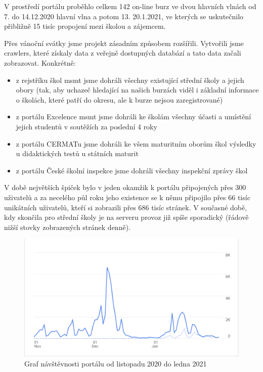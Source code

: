V prostředí portálu proběhlo celkem 142 on-line burz ve dvou hlavních vlnách od 7. do 14.12.2020 \textemdash{} hlavní vlna a potom 13. \textemdash{} 20.1.2021,
ve kterých se uskutečnilo přibližně 15 tisíc propojení mezi školou a zájemcem. 

Přes vánoční svátky jsme projekt zásadním způsobem rozšířili.
Vytvořili jsme \glspl{crawler}, které získaly data z veřejně dostupných databází a tato data začali zobrazovat. Konkrétně: 

\begin{itemize}
  \item z rejstříku škol \acrshort{msmt} jsme dohráli všechny existující střední školy a jejich obory (tak, aby uchazeč hledající na našich burzách viděl i základní informace o školách, které patří do okresu, ale k burze nejsou zaregistrované)
  \item z portálu Excelence \acrshort{msmt} jsme dohráli ke školám všechny účasti a umístění jejich studentů v soutěžích za poslední 4 roky
  \item z portálu CERMATu jsme dohráli ke všem maturitním oborům škol výsledky u didaktických testů u státních maturit
  \item z portálu České školní inspekce jsme dohráli všechny inspekční zprávy škol
\end{itemize}

V době největších špiček bylo v jeden okamžik k portálu připojených přes 300 uživatelů 
a za necelého půl roku jeho existence se k němu připojilo přes 66 tisíc unikátních uživatelů,
kteří si zobrazili přes 686 tisíc stránek.
V současné době, kdy skončila pro střední školy  je na serveru provoz již spíše sporadický (řádově nižší stovky zobrazených stránek denně). 


\begin{figure}[H]
\centering
\includegraphics[width=\textwidth]{img/listopad-leden-navstevnost.png}
\caption{Graf návštěvnosti portálu \bso{} od listopadu 2020 do ledna 2021}\label{fig:navstevnost}
\end{figure}

